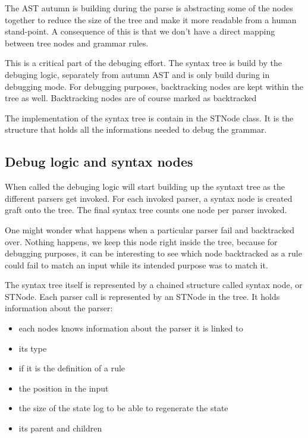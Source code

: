 	The AST autumn is building during the parse is abstracting some of the nodes together to reduce the size of the tree and make it more readable from a human stand-point. A consequence of this is that we don't have a direct mapping between tree nodes and grammar rules.

	\bigskip

	This is a critical part of the debuging effort. The syntax tree is build by the debuging logic, separately from autumn AST and is only build during in debugging mode.
 	For debugging purposes, backtracking nodes are kept within the tree as well. Backtracking nodes are of course marked as backtracked

 	\bigskip

	The implementation of the syntax tree is contain in the STNode class. It is the structure that holds all the informations needed to debug the grammar.


%
		\subsection{Debug logic and syntax nodes}
%

	When called the debuging logic will start building up the syntaxt tree as the different parsers get invoked. For each invoked parser, a syntax node is created graft onto the tree. The final syntax tree counts one node per parser invoked.

	One might wonder what happens when a particular parser fail and backtracked over. Nothing happens, we keep this node right inside the tree, because for debugging purposes, it can be interesting to see which node backtracked as a rule could fail to match an input while its intended purpose was to match it.

	\bigskip

	The syntax tree itself is represented by a chained structure called syntax node, or STNode. Each parser call is represented by an STNode in the tree. It holds information about the parser:

	\begin{itemize}
		\item each nodes knows information about the parser it is linked to
		\item its type
		\item if it is the definition of a rule
		\item the position in the input
		\item the size of the state log to be able to regenerate the state
		\item its parent and children
	\end{itemize}

